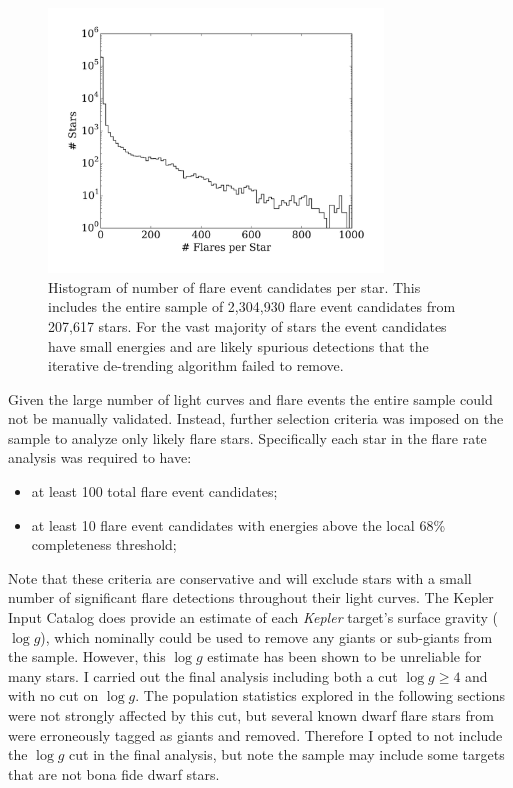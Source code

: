 \documentclass[twocolumn]{aastex6}
\newcommand{\Kepler}{\textsl{Kepler}\xspace}
\begin{document}
\begin{figure}[!t]
\centering
\includegraphics[width=3.5in]{fig3}
\caption{
Histogram of number of flare event candidates per star. This includes the entire sample of 2,304,930 flare event candidates from 207,617 stars. For the vast majority of stars the event candidates have small energies and are likely spurious detections that the iterative de-trending algorithm failed to remove.
}
\label{fig:flarehist}
\end{figure}


Given the large number of light curves and flare events the entire sample could not be manually validated. Instead, further selection criteria was imposed on the sample to analyze only likely flare stars. Specifically each star in the flare rate analysis was required to have:
\begin{itemize}
\item at least 100 total flare event candidates;
\item at least 10 flare event candidates with energies above the local 68\% completeness threshold;
\end{itemize}
Note that these criteria are conservative and will exclude stars with a small number of significant flare detections throughout their light curves.
The Kepler Input Catalog \citep{brown2011a} does provide an estimate of each \Kepler target's surface gravity ($\log g$), which nominally could be used to remove any giants or sub-giants from the sample. However, this $\log g$ estimate has been shown to be unreliable for many stars. I carried out the final analysis including both a cut $\log g \ge 4$ and with no cut on $\log g$. The population statistics explored in the following sections were not strongly affected by this cut, but several known dwarf flare stars from \citet{walkowicz2011} were erroneously tagged as giants and removed. Therefore I opted to not include the $\log g$ cut in the final analysis, but note the sample may include some targets that are not bona fide dwarf stars.
\end{document}
